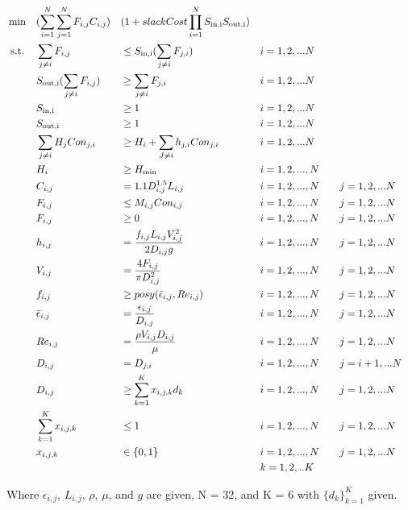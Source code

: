 \documentclass[12pt]{article}
\begin{document}
	\begin{equation}
	\begin{aligned}
	&\min &&(\sum_{i=1}^{N}\sum_{j=1}^{N} F_{i,j} C_{i,j})&&(1 + slackCost \prod_{i=1}^{N}S_{\rm{in},i}S_{\rm{out},i})\\
	& \text{ s.t.} && \sum_{j \neq i} F_{i,j} && \leq S_{\rm{in},i}(\sum_{j \neq i} F_{j,i}) \quad && i = 1, 2, ... N\\
	& && S_{\rm{out},i}(\sum_{j \neq i} F_{i,j}) && \geq \sum_{j \neq i} F_{j,i} \quad && i = 1, 2, ... N\\
	& && S_{\rm{in},i} && \geq 1 \quad && i = 1, 2, ... N\\
	& && S_{\rm{out},i} && \geq 1 \quad && i = 1, 2, ... N\\
	& && \sum_{j \neq i} H_j Con_{j,i} && \geq H_i + \sum_{J \neq i} h_{j,i}Con_{j,i} && i = 1,2, ...N\\
	& && H_i && \geq H_{\rm{min}} && i = 1, 2, ..., N \\
	& && C_{i,j} && = 1.1 D_{i,j}^{1.5} L_{i,j} && i = 1, 2, ..., N \quad && j = 1, 2, ... N\\
	& && F_{i,j} && \leq M_{i,j} Con_{i,j} && i = 1, 2, ..., N \quad && j = 1, 2, ... N\\
	& && F_{i,j} && \geq 0 && i = 1, 2, ..., N \quad && j = 1, 2, ... N\\
	& && h_{i,j} && = \frac{f_{i,j} L_{i,j} V_{i,j}^2}{2D_{i,j} g} && i = 1, 2, ..., N \quad && j = 1, 2, ... N\\
	& && V_{i,j} && = \frac{4 F_{i,j}}{\pi D_{i,j}^2} && i = 1, 2, ..., N \quad && j = 1, 2, ... N\\
	& && f_{i,j} &&\geq posy(\bar{\epsilon}_{i,j}, Re_{i,j}) && i = 1, 2, ..., N \quad && j = 1, 2, ... N\\
	& && \bar{\epsilon}_{i,j} && = \frac{\epsilon_{i,j}}{D_{i,j}} && i = 1, 2, ..., N \quad && j = 1, 2, ... N\\
	& && Re_{i,j} && = \frac{\rho V_{i,j} D_{i,j}}{\mu} && i = 1, 2, ..., N \quad && j = 1, 2, ... N\\
	& && D_{i,j} && = D_{j,i} && i = 1, 2, ..., N \quad && j = i+1, ... N\\
	& && D_{i,j} && \geq \sum_{k=1}^{K}x_{i,j,k}d_k && i = 1, 2, ..., N \quad && j = 1, 2, ... N\\
	& && \sum_{k=1}^{K} x_{i,j,k} && \leq 1 && i = 1, 2, ..., N \quad && j = 1, 2, ... N\\
	& && x_{i,j,k} && \in \{0,1\} && i = 1, 2, ..., N \quad && j = 1, 2, ... N \\
	& && && && k = 1,2, ..K\\ 
	\end{aligned}
	\end{equation}
	
	Where $\epsilon_{i,j}$, $L_{i,j}$, $\rho$, $\mu$, and $g$ are given, N = 32, and K = 6 with $\{d_k\}_{k=1}^{K}$ given. 
	
	
\end{document}
